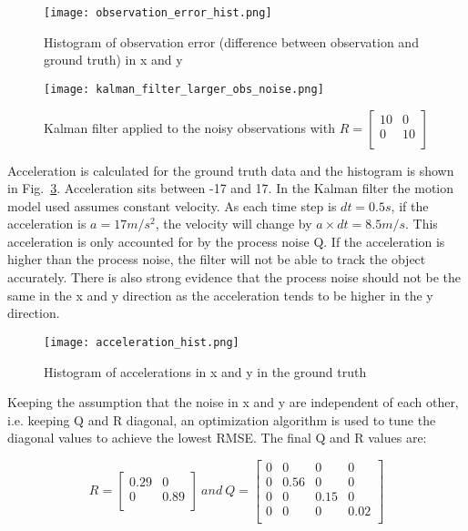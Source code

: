 \documentclass{report}
\begin{document}
\begin{figure}[ht]
    \centering
    \texttt{[image: observation\_error\_hist.png]}
    \caption{Histogram of observation error (difference between observation and ground truth) in x and y}
    \label{fig:observation_error_hist}
\end{figure}

\begin{figure}[ht]
    \centering
    \texttt{[image: kalman\_filter\_larger\_obs\_noise.png]}
    \caption{Kalman filter applied to the noisy observations with \(R = \begin{bmatrix} 
        10 & 0 \\
        0 & 10 \\
    \end{bmatrix}\)}
    \label{fig:kalman_filter_larger_obs_noise}
\end{figure}

Acceleration is calculated for the ground truth data and the histogram is shown in Fig.~\ref{fig:acceleration_hist}. Acceleration sits between -17 and 17. In the Kalman filter the motion model used assumes constant velocity. As each time step is \(dt=0.5s\), if the acceleration is \(a = 17 m/s^2\), the velocity will change by \(a \times dt = 8.5m/s\). This acceleration is only accounted for by the process noise Q. If the acceleration is higher than the process noise, the filter will not be able to track the object accurately. There is also strong evidence that the process noise should not be the same in the x and y direction as the acceleration tends to be higher in the y direction.

\begin{figure}[ht]
    \centering
    \texttt{[image: acceleration\_hist.png]}
    \caption{Histogram of accelerations in x and y in the ground truth}
    \label{fig:acceleration_hist}
\end{figure}

Keeping the assumption that the noise in x and y are independent of each other, i.e. keeping Q and R diagonal, an optimization algorithm is used to tune the diagonal values to achieve the lowest RMSE. The final Q and R values are:

\begin{equation}
R = \begin{bmatrix} 
    0.29 & 0    \\
    0    & 0.89 \\
\end{bmatrix}\ and\ Q = \begin{bmatrix} 
    0 & 0    & 0    & 0    \\
    0 & 0.56 & 0    & 0    \\
    0 & 0    & 0.15 & 0    \\
    0 & 0    & 0    & 0.02 \\
\end{bmatrix}
\end{equation}
\end{document}
